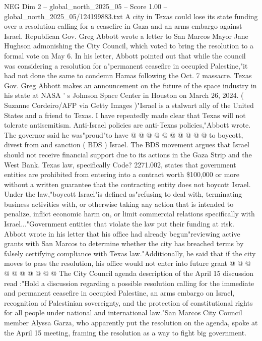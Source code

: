 \begin{textsample}{NEG Dim 2 – global\_north\_2025\_05 – Score 1.00 – global\_north\_2025\_05/124199883.txt}  \label{ex:f2_neg_034}
A city in Texas could lose its state funding over a resolution calling for a ceasefire in Gaza and an arms embargo against Israel.
Republican Gov.
Greg Abbott wrote a letter to San Marcos Mayor Jane Hughson admonishing the City Council, which voted to bring the resolution to a formal vote on May 6.
In his letter, Abbott pointed out that while the council was considering a resolution for a"permanent ceasefire in occupied Palestine,"it had not done the same to condemn Hamas following the Oct. 7 massacre.
Texas Gov.
Greg Abbott makes an announcement on the future of the space industry in his state at NASA ' s Johnson Space Center in Houston on March 26, 2024. ( Suzanne Cordeiro/AFP via Getty Images )"Israel is a stalwart ally of the United States and a friend to Texas.
I have repeatedly made clear that Texas will not tolerate antisemitism.
Anti-Israel policies are anti-Texas policies,"Abbott wrote.
The governor said he was"proud"to have @ @ @ @ @ @ @ @ @ @ to boycott, divest from and sanction ( BDS ) Israel.
The BDS movement argues that Israel should not receive financial support due to its actions in the Gaza Strip and the West Bank.
Texas law, specifically Code? 2271.002, states that government entities are prohibited from entering into a contract worth \$100,000 or more without a written guarantee that the contracting entity does not boycott Israel.
Under the law,"boycott Israel"is defined as"refusing to deal with, terminating business activities with, or otherwise taking any action that is intended to penalize, inflict economic harm on, or limit commercial relations specifically with Israel..."Government entities that violate the law put their funding at risk.
Abbott wrote in his letter that his office had already begun"reviewing active grants with San Marcos to determine whether the city has breached terms by falsely certifying compliance with Texas law."Additionally, he said that if the city moves to pass the resolution, his office would not enter into future grant @ @ @ @ @ @ @ @ @ @ The City Council agenda description of the April 15 discussion read :"Hold a discussion regarding a possible resolution calling for the immediate and permanent ceasefire in occupied Palestine, an arms embargo on Israel, recognition of Palestinian sovereignty, and the protection of constitutional rights for all people under national and international law."San Marcos City Council member Alyssa Garza, who apparently put the resolution on the agenda, spoke at the April 15 meeting, framing the resolution as a way to fight big government.

\end{textsample}
